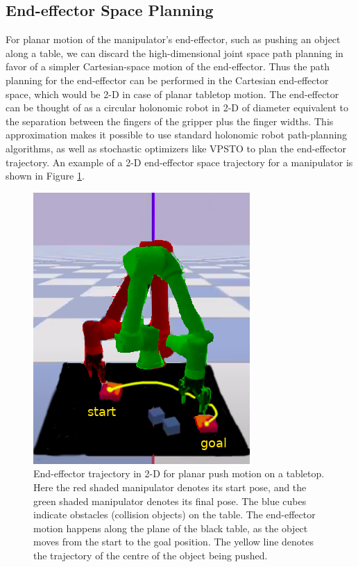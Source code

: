 \subsection{End-effector Space Planning}

For planar motion of the manipulator's end-effector, such as pushing an object along a table, we can discard the high-dimensional joint space path planning in favor of a simpler Cartesian-space motion of the end-effector. Thus the path planning for the end-effector can be performed in the Cartesian end-effector space, which would be 2-D in case of planar tabletop motion. The end-effector can be thought of as a circular holonomic robot in 2-D of diameter equivalent to the separation between the fingers of the gripper plus the finger widths. This approximation makes it possible to use standard holonomic robot path-planning algorithms, as well as stochastic optimizers like VPSTO to plan the end-effector trajectory. An example of a 2-D end-effector space trajectory for a manipulator is shown in Figure \ref{fig:end-eff-traj}.

\begin{figure}[ht]
    \centering
    \includegraphics[scale=0.5]{figures/bl-manipulator/end_eff_traj.png}
    \caption[End-Effector trajectory in 2-D]{End-effector trajectory in 2-D for planar push motion on a tabletop. Here the red shaded manipulator denotes its start pose, and the green shaded manipulator denotes its final pose. The blue cubes indicate obstacles (collision objects) on the table. The end-effector motion happens along the plane of the black table, as the object moves from the start to the goal position. The yellow line denotes the trajectory of the centre of the object being pushed.}
    \label{fig:end-eff-traj}
\end{figure}

